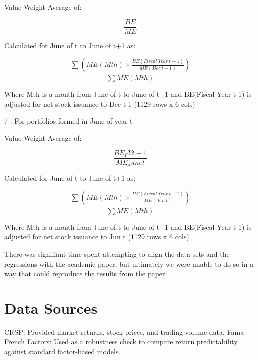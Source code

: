\documentclass[12pt]{article}
\begin{document}
Value Weight Average of:

\[
\frac{BE}{ME}
\]

Calculated for June of t to June of t+1 as:    

\[
\frac{\sum \left( ME(Mth) \times \frac{BE(Fiscal\ Year\ t-1)}{ME(Dec\ t-1)} \right)}
     {\sum ME(Mth)}
\]

Where Mth is a month from June of t to June of t+1 and BE(Fiscal Year t-1) is adjusted for net stock issuance to Dec t-1 (1129 rows x 6 cols)


7 : For portfolios formed in June of year t   

Value Weight Average of:

\[
\frac{BE_FYt-1}{ME_June t}
\]

Calculated for June of t to June of t+1 as:    

\[
\frac{\sum \left( ME(Mth) \times \frac{BE(Fiscal\ Year\ t-1)}{ME(Jun\ t)} \right)}
     {\sum ME(Mth)}
\]

Where Mth is a month from June of t to June of t+1 and BE(Fiscal Year t-1) is adjusted for net stock issuance to Jun t (1129 rows x 6 cols)



There was signifiant time spent attempting to align the data sets and the regressions with the academic paper, but 
ultimately we were unable to do so in a way that could reproduce the results from the paper.




\doublespacing
\section{Data Sources}

CRSP: Provided market returns, stock prices, and trading volume data.
Fama-French Factors: Used as a robustness check to compare return predictability against standard factor-based models.
\end{document}
